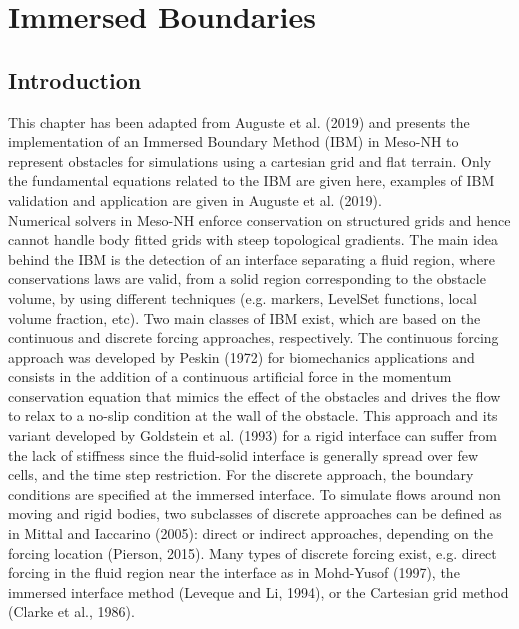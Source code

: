 %
\chapter{Immersed Boundaries}
\minitoc
%
\section{Introduction}
%
This chapter has been adapted from Auguste et al. (2019) and presents the implementation 
of an Immersed Boundary Method (IBM) in Meso-NH to represent obstacles for simulations 
using a cartesian grid and flat terrain. Only the fundamental equations related to the 
IBM are given here, examples of IBM validation and application are given in 
Auguste et al. (2019). \\
%
Numerical solvers in Meso-NH enforce conservation on structured grids and hence cannot 
handle body fitted grids with steep topological gradients. The main idea behind the IBM 
is the detection of an interface separating a fluid region, where conservations laws 
are valid, from a solid region corresponding to the obstacle volume, by using different 
techniques (e.g. markers, LevelSet functions, local volume fraction, etc). 
Two main classes of IBM exist, which are based on the continuous and discrete forcing 
approaches, respectively. The continuous forcing approach was developed by Peskin (1972) 
for biomechanics applications and consists in the addition of a continuous artificial 
force in the momentum conservation equation that mimics the effect of the obstacles and 
drives the flow to relax to a no-slip condition at the wall of the obstacle. This approach 
and its variant developed by Goldstein et al. (1993) for a rigid interface can suffer 
from the lack of stiffness since the fluid-solid interface is generally spread over 
few cells, and the time step restriction. For the discrete approach, 
the boundary conditions are specified at the immersed interface. To simulate flows 
around non moving and rigid bodies, two subclasses of discrete approaches can be 
defined as in Mittal and Iaccarino (2005): direct or indirect approaches, depending 
on the forcing location (Pierson, 2015). Many types of discrete forcing exist, e.g. 
direct forcing in the fluid region near the interface as in Mohd-Yusof (1997), the 
immersed interface method (Leveque and Li, 1994), or the Cartesian grid method (Clarke et al., 1986). 
